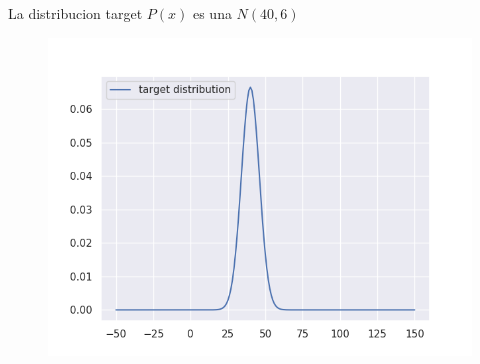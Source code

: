 \documentclass[11pt,a4paper]{article}
\begin{document}
	La distribucion target $P(x)$ es una $N(40,6)$
	\begin{figure}[H]
  			\centering
    			\includegraphics[width=14cm]{imagenes/target}
	\end{figure}
\end{document}
